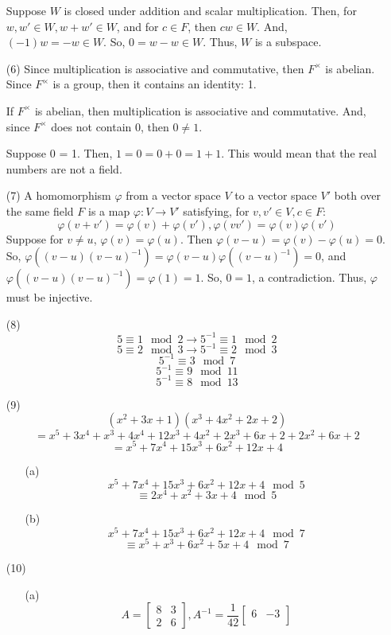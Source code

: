 \begin{itemize}
Suppose $W$ is closed under addition and scalar multiplication. Then, for $w, w' \in W, w + w' \in W$, and for $c \in F$, then $cw \in W$. And, $(-1)w = -w \in W$. So, $0 = w - w \in W$. Thus, $W$ is a subspace.
\item[(6)]
Since multiplication is associative and commutative, then $F^\times$ is abelian. Since $F^\times$ is a group, then it contains an identity: 1.

If $F^\times$ is abelian, then multiplication is associative and commutative. And, since $F^\times$ does not contain 0, then $0 \neq 1$.

Suppose 0 = 1. Then, $1 = 0 = 0 + 0 = 1 + 1$. This would mean that the real numbers are not a field.
\item[(7)]
A homomorphism $\varphi$ from a vector space $V$ to a vector space $V'$ both over the same field $F$ is a map $\varphi: V \rightarrow V'$ satisfying, for $v, v' \in V, c \in F$:
$$\varphi(v + v') = \varphi(v) + \varphi(v'), \varphi(vv') = \varphi(v)\varphi(v')$$
Suppose for $v \neq u$, $\varphi(v) = \varphi(u)$. Then $\varphi(v - u) = \varphi(v) - \varphi(u) = 0$. So, $\varphi((v - u)(v - u)^{-1}) = \varphi(v-u)\varphi((v-u)^{-1}) = 0$, and $\varphi((v - u)(v - u)^{-1}) = \varphi(1) = 1$. So, $0 = 1$, a contradiction. Thus, $\varphi$ must be injective.
\item[(8)]
$$5 \equiv 1 \mod 2 \rightarrow 5^{-1} \equiv 1 \mod 2$$
$$5 \equiv 2 \mod 3 \rightarrow 5^{-1} \equiv 2 \mod 3$$
$$5^{-1} \equiv 3 \mod 7$$
$$5^{-1} \equiv 9 \mod 11$$
$$5^{-1} \equiv 8 \mod 13$$
\item[(9)]
$$(x^2 + 3x + 1)(x^3 + 4x^2 + 2x + 2)$$
$$= x^5 + 3x^4 + x^3 + 4x^4 + 12x^3 + 4x^2 + 2x^3 + 6x + 2 + 2x^2 + 6x + 2$$
$$= x^5 + 7x^4 + 15x^3 + 6x^2 + 12x + 4$$
\begin{itemize}
\item[(a)]
$$x^5 + 7x^4 + 15x^3 + 6x^2 + 12x + 4 \mod 5$$
$$\equiv 2x^4 + x^2 + 3x + 4 \mod 5$$
\item[(b)]
$$x^5 + 7x^4 + 15x^3 + 6x^2 + 12x + 4 \mod 7$$
$$\equiv x^5 + x^3 + 6x^2 + 5x + 4 \mod 7$$
\end{itemize}
\item[(10)]
\begin{itemize}
\item[(a)]
$$A = \begin{bmatrix}
8 & 3 \\
2 & 6
\end{bmatrix}, A^{-1} = \frac{1}{42}\begin{bmatrix}
6 & -3 \\

\end{bmatrix}$$
\end{itemize}
\end{itemize}
